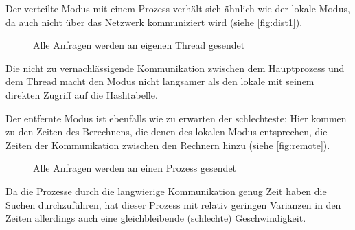 \documentclass{scrreprt}
\begin{document}
Der verteilte Modus mit einem Prozess verhält sich ähnlich wie der lokale Modus, da auch nicht über das Netzwerk kommuniziert wird (siehe \autoref{fig:dist1}). %
\begin{figure}[!ht]
\centering
{}
\caption{Alle Anfragen werden an eigenen Thread gesendet}
\label{fig:dist1}
\end{figure}%
Die nicht zu vernachlässigende Kommunikation zwischen dem Hauptprozess und dem Thread macht den Modus nicht langsamer als den lokale mit seinem direkten Zugriff auf die Hashtabelle. \bigskip

Der entfernte Modus ist ebenfalls wie zu erwarten der schlechteste: Hier kommen zu den Zeiten des Berechnens, die denen des lokalen Modus entsprechen, die Zeiten der Kommunikation zwischen den Rechnern hinzu (siehe \autoref{fig:remote}). %
\begin{figure}[!ht]
\centering
{}
\caption{Alle Anfragen werden an einen Prozess gesendet}
\label{fig:remote}
\end{figure}%
Da die Prozesse durch die langwierige Kommunikation genug Zeit haben die Suchen durchzuführen, hat dieser Prozess mit relativ geringen Varianzen in den Zeiten allerdings auch eine gleichbleibende (schlechte) Geschwindigkeit. \bigskip
\end{document}
